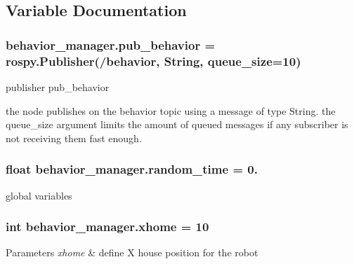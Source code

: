 \subsection{Variable Documentation}
\subsubsection[{\texorpdfstring{pub\+\_\+behavior}{pub_behavior}}]{\setlength{\rightskip}{0pt plus 5cm}behavior\+\_\+manager.\+pub\+\_\+behavior = rospy.\+Publisher(\textquotesingle{}/behavior\textquotesingle{}, String, queue\+\_\+size=10)}\hypertarget{namespacebehavior__manager_ac30069bca00035c62a13df72bf29a3aa}{}\label{namespacebehavior__manager_ac30069bca00035c62a13df72bf29a3aa}


publisher pub\+\_\+behavior 

the node publishes on the behavior topic using a message of type String. the queue\+\_\+size argument limits the amount of queued messages if any subscriber is not receiving them fast enough. 
\subsubsection[{\texorpdfstring{random\+\_\+time}{random_time}}]{\setlength{\rightskip}{0pt plus 5cm}float behavior\+\_\+manager.\+random\+\_\+time = 0.}\hypertarget{namespacebehavior__manager_a53d496c1cdb4a1a21f698d78a6baeb6e}{}\label{namespacebehavior__manager_a53d496c1cdb4a1a21f698d78a6baeb6e}


global variables 

\subsubsection[{\texorpdfstring{xhome}{xhome}}]{\setlength{\rightskip}{0pt plus 5cm}int behavior\+\_\+manager.\+xhome = 10}\hypertarget{namespacebehavior__manager_a49c9b541017b9483f311fd59e6f7fec6}{}\label{namespacebehavior__manager_a49c9b541017b9483f311fd59e6f7fec6}

\begin{DoxyParams}{Parameters}
{\em xhome} & define X house position for the robot \\
\hline
\end{DoxyParams}
